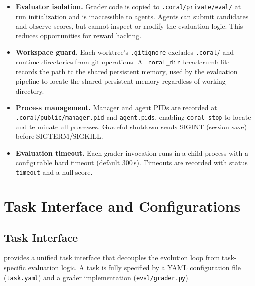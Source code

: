 \begin{itemize}[leftmargin=*]
    \item \textbf{Evaluator isolation.} Grader code is copied to \texttt{.coral/private/eval/} at run initialization and is inaccessible to agents. Agents can submit candidates and observe scores, but cannot inspect or modify the evaluation logic. This reduces opportunities for reward hacking.
    \item \textbf{Workspace guard.} Each worktree's \texttt{.gitignore} excludes \texttt{.coral/} and runtime directories from git operations. A \texttt{.coral\_dir} breadcrumb file records the path to the shared persistent memory, used by the evaluation pipeline to locate the shared persistent memory regardless of working directory.
    \item \textbf{Process management.} Manager and agent PIDs are recorded at \texttt{.coral/public/manager.pid} and \texttt{agent.pids}, enabling \texttt{coral stop} to locate and terminate all processes. Graceful shutdown sends SIGINT (session save) before SIGTERM/SIGKILL.
    \item \textbf{Evaluation timeout.} Each grader invocation runs in a child process with a configurable hard timeout (default 300\,s). Timeouts are recorded with status \texttt{timeout} and a null score.
\end{itemize}


\section{Task Interface and Configurations}
\label{app:tasks}

\subsection{Task Interface}
\label{app:task_interface}

\method{} provides a unified task interface that decouples the evolution loop from task-specific evaluation logic. A task is fully specified by a YAML configuration file (\texttt{task.yaml}) and a grader implementation (\texttt{eval/grader.py}).


